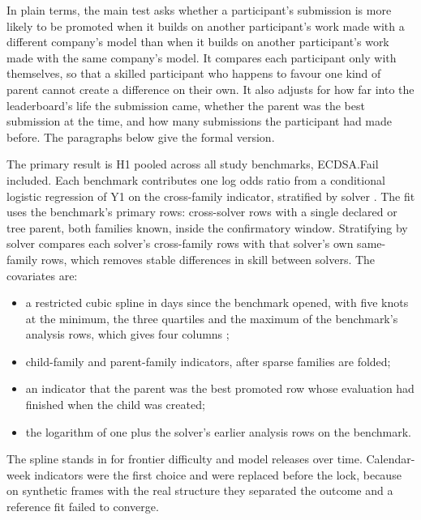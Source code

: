 In plain terms, the main test asks whether a participant's submission is more likely to be promoted when it builds on another participant's work made with a different company's model than when it builds on another participant's work made with the same company's model.
It compares each participant only with themselves, so that a skilled participant who happens to favour one kind of parent cannot create a difference on their own.
It also adjusts for how far into the leaderboard's life the submission came, whether the parent was the best submission at the time, and how many submissions the participant had made before.
The paragraphs below give the formal version.

The primary result is H1 pooled across all study benchmarks, ECDSA.Fail included.
Each benchmark contributes one log odds ratio from a conditional logistic regression of Y1 on the cross-family indicator, stratified by solver \citep{breslow1980}.
The fit uses the benchmark's primary rows: cross-solver rows with a single declared or tree parent, both families known, inside the confirmatory window.
Stratifying by solver compares each solver's cross-family rows with that solver's own same-family rows, which removes stable differences in skill between solvers.
The covariates are:
\begin{itemize}
  \item a restricted cubic spline in days since the benchmark opened, with five knots at the minimum, the three quartiles and the maximum of the benchmark's analysis rows, which gives four columns \citep{harrell2015};
  \item child-family and parent-family indicators, after sparse families are folded;
  \item an indicator that the parent was the best promoted row whose evaluation had finished when the child was created;
  \item the logarithm of one plus the solver's earlier analysis rows on the benchmark.
\end{itemize}
The spline stands in for frontier difficulty and model releases over time.
Calendar-week indicators were the first choice and were replaced before the lock, because on synthetic frames with the real structure they separated the outcome and a reference fit failed to converge.

